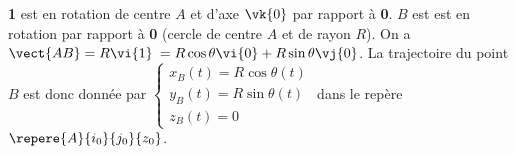\begin{corrigebox}
\textbf{1} est en rotation de centre $A$ et d'axe $\vk{0}$ par rapport à \textbf{0}.
$B$ est est en rotation par rapport à \textbf{0} (cercle de centre $A$ et de rayon $R$).
On a $\vect{AB}=R\vi{1}$ $=R\cos\theta \vi{0}+R\sin\theta \vj{0}$. La trajectoire du point $B$ est donc donnée par 
$\left\{ 
\begin{array}{l}
x_B(t) = R\cos\theta (t) \\
y_B(t) = R\sin\theta (t) \\
z_B(t)=0 
\end{array}
\right.$ dans le repère $\repere{A}{i_0}{j_0}{z_0}$.
\end{corrigebox}
